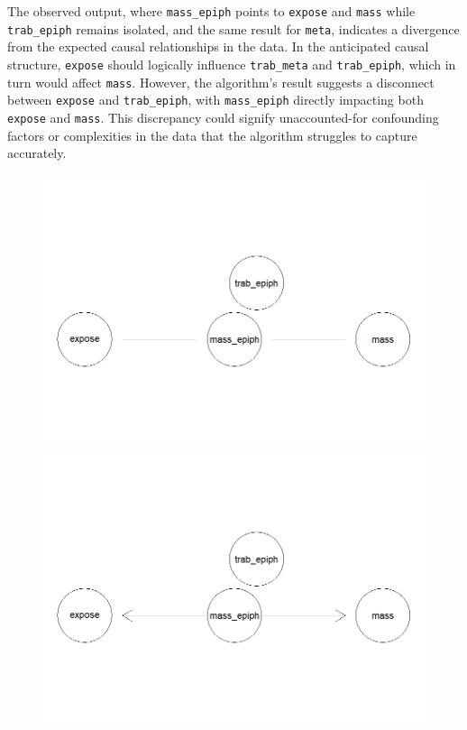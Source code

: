 \documentclass{article}
\begin{document}
The observed output, where \texttt{mass\_epiph} points to \texttt{expose} and \texttt{mass} while \texttt{trab\_epiph} remains isolated, and the same result for \texttt{meta}, indicates a divergence from the expected causal relationships in the data. In the anticipated causal structure, \texttt{expose} should logically influence \texttt{trab\_meta} and \texttt{trab\_epiph}, which in turn would affect \texttt{mass}. However, the algorithm's result suggests a disconnect between \texttt{expose} and \texttt{trab\_epiph}, with \texttt{mass\_epiph} directly impacting both \texttt{expose} and \texttt{mass}. This discrepancy could signify unaccounted-for confounding factors or complexities in the data that the algorithm struggles to capture accurately.


\begin{figure}[h] %
    \begin{minipage}{0.45\textwidth}
        \centering
        \includegraphics[width=\linewidth]{epiph.png}
    \end{minipage}
    \hfill
    \begin{minipage}{0.45\textwidth}
        \centering
        \includegraphics[width=\linewidth]{c_epiph.png}
    \end{minipage}
\end{figure}
\end{document}
